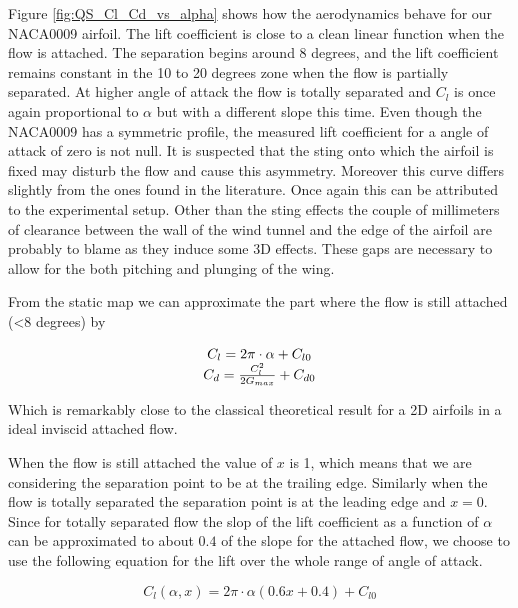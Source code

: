 \par Figure \ref{fig:QS_Cl_Cd_vs_alpha} shows how the aerodynamics behave for our NACA0009 airfoil.
The lift coefficient is close to a clean linear function when the flow is attached.
The separation begins around 8 degrees, and the lift coefficient remains constant in the 10 to 20 degrees zone when the flow is partially separated.
At higher angle of attack the flow is totally separated and $C_l$ is once again proportional to $\alpha$ but with a different slope this time.
Even though the NACA0009 has a symmetric profile, the measured lift coefficient for a angle of attack of zero is not null.
It is suspected that the sting onto which the airfoil is fixed may disturb the flow and cause this asymmetry.
Moreover this curve differs slightly from the ones found in the literature.
Once again this can be attributed to the experimental setup.
Other than the sting effects the couple of millimeters of clearance between the wall of the wind tunnel and the edge of the airfoil are probably to blame as they induce some 3D effects.
These gaps are necessary to allow for the both pitching and plunging of the wing.

\par From the static map we can approximate the part where the flow is still attached (<8 degrees) by 

\begin{equation}
  \begin{array}[c]{c}
    C_l= 2 \pi \cdot \alpha + C_{l0} \\
    C_d= \frac{C_l^2}{2G_{max}} + C_{d0}
  \end{array}
  \label{eqn:attached_Cl_and_Cd_vs_alpha}
\end{equation}

Which is remarkably close to the classical theoretical result for a 2D airfoils in a ideal inviscid attached flow.

When the flow is still attached the value of $x$ is 1, which means that we are considering the separation point to be at the trailing edge.
Similarly when the flow is totally separated the separation point is at the leading edge and $x=0$.
Since for totally separated flow the slop of the lift coefficient as a function of $\alpha$ can be approximated to about $0.4$ of the slope for the attached flow, we choose to use the following equation for the lift over the whole range of angle of attack. 

\begin{equation}
  C_l(\alpha,x)=2 \pi \cdot \alpha (0.6 x + 0.4) + C_{l0}
  \label{eqn:Cl_function}
\end{equation}

